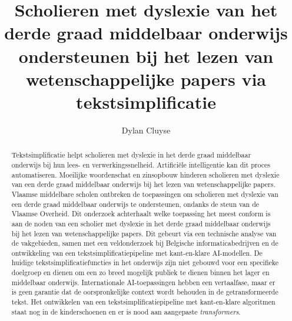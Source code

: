 \documentclass{hogent-article}
\title{Scholieren met dyslexie van het derde graad middelbaar onderwijs ondersteunen bij het lezen van wetenschappelijke papers via tekstsimplificatie}
\author{Dylan Cluyse}
\begin{document}
\begin{abstract}
Tekstsimplificatie helpt scholieren met dyslexie in het derde graad middelbaar onderwijs bij hun lees- en verwerkingssnelheid. Artificiële intelligentie kan dit proces automatiseren. Moeilijke woordenschat en zinsopbouw hinderen scholieren met dyslexie van een derde graad middelbaar onderwijs bij het lezen van wetenschappelijke papers. Vlaamse middelbare scholen ontbreken de toepassingen om scholieren met dyslexie van een derde graad middelbaar onderwijs te ondersteunen, ondanks de steun van de Vlaamse Overheid. Dit onderzoek achterhaalt welke toepassing het meest conform is aan de noden van een scholier met dyslexie in het derde graad middelbaar onderwijs bij het lezen van wetenschappelijke papers.  Dit gebeurt via een technische analyse van de vakgebieden, samen met een veldonderzoek bij Belgische informaticabedrijven en de ontwikkeling van een tekstsimplificatiepipeline met kant-en-klare AI-modellen. De huidige tekstsimplificatiefuncties in het onderwijs zijn niet gebouwd voor een specifieke doelgroep en dienen om een zo breed mogelijk publiek te dienen binnen het lager en middelbaar onderwijs. Internationale AI-toepassingen hebben een vertaalfase, maar er is geen garantie dat de oorspronkelijke context wordt behouden in de getransformeerde tekst. Het ontwikkelen van een tekstsimplificatiepipeline met kant-en-klare algoritmen staat nog in de kinderschoenen en er is nood aan aangepaste \textit{transformers}.
\end{abstract}

\tableofcontents



\printbibliography[heading=bibintoc]
\end{document}
